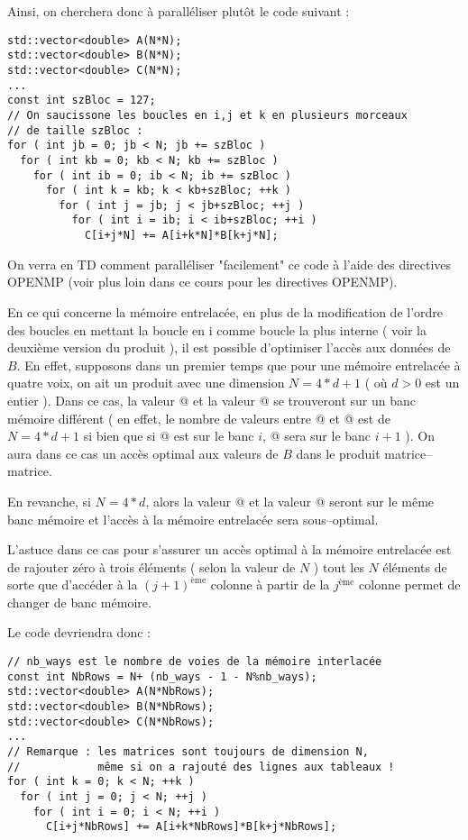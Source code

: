 \documentclass[fleqn,11pt]{article}
\begin{document}
Ainsi, on cherchera donc à paralléliser plutôt le code suivant :
\begin{lstlisting}
std::vector<double> A(N*N);
std::vector<double> B(N*N);
std::vector<double> C(N*N);
...
const int szBloc = 127;
// On saucissone les boucles en i,j et k en plusieurs morceaux 
// de taille szBloc :
for ( int jb = 0; jb < N; jb += szBloc )
  for ( int kb = 0; kb < N; kb += szBloc )
    for ( int ib = 0; ib < N; ib += szBloc )
      for ( int k = kb; k < kb+szBloc; ++k )
        for ( int j = jb; j < jb+szBloc; ++j )
          for ( int i = ib; i < ib+szBloc; ++i )
            C[i+j*N] += A[i+k*N]*B[k+j*N];
\end{lstlisting}

On verra en TD comment paralléliser "facilement" ce code à l'aide des directives OPENMP (voir plus loin dans ce cours pour les directives OPENMP).

En ce qui concerne la mémoire entrelacée, en plus de la modification de l'ordre des boucles en mettant la boucle en i comme boucle la plus interne ( voir la deuxième version du produit ), 
il est possible d'optimiser l'accès aux données de $B$. En effet, supposons dans un premier temps
que pour une mémoire entrelacée à quatre voix, on ait un produit avec une dimension $N=4*d+1$ ( où $d>0$ est un entier ).
Dans ce cas, la valeur \lstinline@B[k+j*N]@ et la valeur \lstinline@B[k+(j+1)*N]@ se trouveront sur un banc mémoire différent ( en effet, le nombre de valeurs entre  \lstinline@B[k+j*N]@ et \lstinline@B[k+(j+1)*N]@ est de $N=4*d+1$ si bien que si \lstinline@B[k+j*N]@ est sur le banc $i$, \lstinline@B[k+(j+1)*N]@ sera sur le banc $i+1$ ). On aura dans ce cas un accès optimal aux valeurs de $B$ dans le produit matrice--matrice.

En revanche, si $N=4*d$, alors la valeur \lstinline@B[k+j*N]@ et la valeur \lstinline@B[k+(j+1)*N]@ seront sur le même banc mémoire et l'accès à la mémoire entrelacée sera sous--optimal.

L'astuce dans ce cas pour s'assurer un accès optimal à la mémoire entrelacée est de rajouter zéro à trois éléments ( selon la valeur de $N$ ) tout les $N$ éléments de sorte que d'accéder à la $(j+1)^{\mbox{ème}}$ colonne à partir de la  $j^{\mbox{ème}}$ colonne permet de changer de banc mémoire.

Le code devriendra donc :
\begin{lstlisting}
// nb_ways est le nombre de voies de la mémoire interlacée
const int NbRows = N+ (nb_ways - 1 - N%nb_ways);
std::vector<double> A(N*NbRows);
std::vector<double> B(N*NbRows);
std::vector<double> C(N*NbRows);
...
// Remarque : les matrices sont toujours de dimension N,
//            même si on a rajouté des lignes aux tableaux !
for ( int k = 0; k < N; ++k )
  for ( int j = 0; j < N; ++j )
    for ( int i = 0; i < N; ++i )
      C[i+j*NbRows] += A[i+k*NbRows]*B[k+j*NbRows];
\end{lstlisting}
\end{document}
